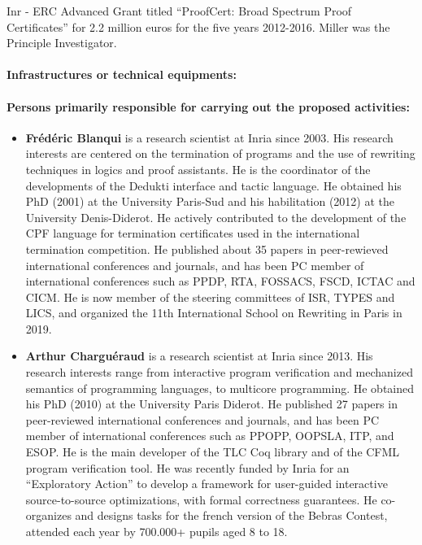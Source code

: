 \begin{sitedescription}{Inr}
- ERC Advanced Grant titled “ProofCert: Broad Spectrum Proof
  Certificates” for 2.2 million euros for the five years
  2012-2016. Miller was the Principle Investigator.

\paragraph{Infrastructures or technical equipments:}


\paragraph{Persons primarily responsible for carrying out the proposed activities:}

\begin{itemize} %

\item{\bf Frédéric Blanqui} is a research scientist at Inria since 2003. His research interests are centered on the termination of programs and the use of rewriting techniques in logics and proof assistants. He is the coordinator of the developments of the Dedukti interface and tactic language. He obtained his PhD (2001) at the University Paris-Sud and his habilitation (2012) at the University Denis-Diderot. He actively contributed to the development of the CPF language for termination certificates used in the international termination competition. He published about 35 papers in peer-rewieved international conferences and journals, and has been PC member of international conferences such as PPDP, RTA, FOSSACS, FSCD, ICTAC and CICM. He is now member of the steering committees of ISR, TYPES and LICS, and organized the 11th International School on Rewriting in Paris in 2019.

\item{\bf Arthur Charguéraud} is a research scientist at Inria since 2013.
His research interests range from interactive program verification and mechanized
semantics of programming languages, to multicore programming.
He obtained his PhD (2010) at the University Paris Diderot. He published 27 papers
in peer-reviewed international conferences and journals, and has been PC member
of international conferences such as PPOPP, OOPSLA, ITP, and ESOP. He is the main
developer of the TLC Coq library and of the CFML program verification tool.
He was recently funded by Inria for an ``Exploratory Action'' to develop a framework
for user-guided interactive source-to-source optimizations, with formal correctness
guarantees.
He co-organizes and designs tasks for the french version of the Bebras Contest,
attended each year by 700.000+ pupils aged 8 to 18.



\end{itemize}
\end{sitedescription}
